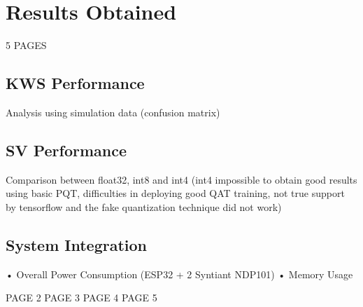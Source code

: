\chapter{Results Obtained}
\label{cha:results obtained}

5 PAGES\newline\newline


\section{KWS Performance}
\label{sec:kws performance}
Analysis using simulation data (confusion matrix)\newline 
\section{SV Performance}
\label{sec:sv performance}
Comparison between float32, int8 and int4 (int4 impossible to obtain good results using basic PQT, difficulties in deploying good QAT training, not true support by tensorflow and the fake quantization technique did not work)\newline 
\section{System Integration}
\label{sec: system integration}
• Overall Power Consumption (ESP32 + 2 Syntiant NDP101)\newline
• Memory Usage\newline

\newpage
\newpage
PAGE 2
\newpage
PAGE 3
\newpage
PAGE 4
\newpage
PAGE 5
\newpage